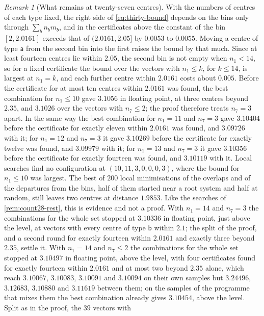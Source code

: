 \documentclass[11pt,reqno]{amsart}
\renewcommand{\_}{\origunderscore\allowbreak}
\numberwithin{equation}{section}
\theoremstyle{plain}
\theoremstyle{definition}
\theoremstyle{remark}
\newtheorem{remark}[thm]{Remark}
\begin{document}
\begin{remark}[What remains at twenty-seven centres]\label{rem:count27-rest}
With the numbers of centres of each type fixed, the right side of
\eqref{eq:thirty-bound} depends on the bins only through $\sum_bn_bm_b$, and
in the certificates above the constant of the bin $[2,2.0161]$ exceeds that
of $(2.0161,2.05]$ by $0.0053$ to $0.0055$. Moving a centre of type
$\mathsf a$ from the second bin into the first raises the bound by that much.
Since at least fourteen centres lie within $2.05$, the second bin is not
empty when $n_1<14$, so for a fixed certificate the bound over the vectors
with $n_1\le k$, for $k\le14$, is largest at $n_1=k$, and each further centre
within $2.0161$ costs about $0.005$. Before the certificate for at most ten
centres within $2.0161$ was found, the best combination for $n_1\le10$ gave
$3.1056$ in floating point, at three centres beyond $2.35$, and $3.1026$
over the vectors with $n_7\le2$; the proof therefore treats $n_7=3$ apart.
In the same way the best combination for $n_1=11$ and $n_7=3$ gave
$3.10404$ before the certificate for exactly eleven within $2.0161$ was
found, and $3.09726$ with it; for $n_1=12$ and $n_7=3$ it gave $3.10269$
before the certificate for exactly twelve was found, and $3.09979$ with
it; for $n_1=13$ and $n_7=3$ it gave $3.10356$ before the certificate for
exactly fourteen was found, and $3.10119$ with it. Local searches find no
configuration at
$(10,11,3,0,0,0,3)$, where the bound for $n_1\le10$ was largest. The best of
$200$ local minimisations of the overlaps and of the departures from the
bins, half of them started near a root system and half at random, still
leaves two centres at distance $1.9853$. Like the searches of
\cref{rem:count28-rest}, this is evidence and not a proof. With $n_1=14$ and $n_7=3$ the
combinations for the whole set stopped at $3.10336$ in floating point, just
above the level, at vectors with every centre of type $\mathsf b$ within
$2.1$; the split of the proof, and a second round for exactly fourteen
within $2.0161$ and exactly three beyond $2.35$, settle it. With $n_1=14$
and $n_7\le2$ the combinations for the whole set stopped at $3.10497$ in
floating point, above the level, with four certificates found for exactly
fourteen within $2.0161$ and at most two beyond $2.35$ alone, which reach
$3.10067$, $3.10083$, $3.10091$ and $3.10094$ on their own samples but
$3.24496$, $3.12683$, $3.10880$ and $3.11619$ between them; on the samples
of the programme that mixes them the best combination already gives
$3.10454$, above the level. Split as in the proof, the $39$ vectors with

\end{remark}
\end{document}
